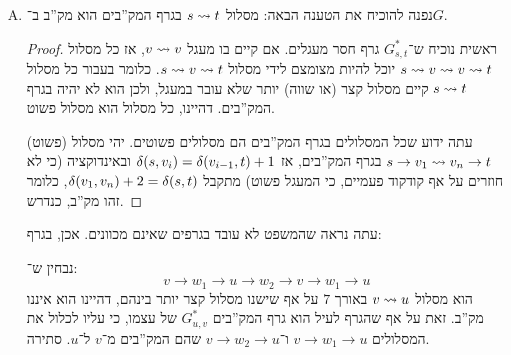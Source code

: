 \documentclass[]{../../../../tex/classes/homework}
\begin{document}
\begin{enumerate}[A.]
\begin{itemize}
			\item \textbf{סיבוכיות: }בבירור $\sof{E'} = 2 \sof E$. סיבוכיות האלגוריתם מהתרגול הייתה $\oc(\sof V + \sof {E'}) =\oc(\sof V + \sof E)$. המיפוי $(v, u) \to \{v, u\}$ לא תפגע בסיבוכיות כי עלותה $\oc(\sof E)$. 
			
			\item \textbf{נכונות: }למה: מסלול $v \to u$ הוא מק''ב בגרף המכוון אמ''מ הוא מק''ב בגרף שאיננו מכוון. ראשית נבחין שבשני הגרפים הוא מסלול כי בשני הכיוונים נוכל להתאים רצף של $w_1, w_2$ במסלול לקשת $(w_1, w_2) \mapsto \{w_1, w_2\}$. אם $v \squig u$ מק''ב בגרף המכוון, נניח בשלילה שיש מסלול קצר יותר בגרף שאיננו מכוון, ואז נוכל להשתמש בהתאמה לעיל כדי ליצור מסלול מכוון קצר יותר מ־$v \squig u$ שהתחלנו ממנו, וזו סתירה. הכיוון השני באופן דומה. 
			
			סה''כ, גרף המקב''ים שבנינו באמצעות האלגוריתם מההרצאה מהלמה לעיל מייצר את גרף המק''בים בפועל של הגרף הלא־מכוון (לאחר הכיוון שתואר בהליך האלגוריתם) כנדרש.
		\end{itemize}
		
		\item נפנה להוכיח את הטענה הבאה: מסלול $s \rightsquigarrow t$ בגרף המק''בים הוא מק''ב ב־$G$. \begin{proof}
			ראשית נוכיח ש־$G^*_{s, t}$ גרף חסר מעגלים. אם קיים בו מעגל $v \rightsquigarrow v$, אז כל מסלול $s \rightsquigarrow v \rightsquigarrow v \rightsquigarrow t$ יוכל להיות מצומצם לידי מסלול $s \rightsquigarrow v \rightsquigarrow t$. כלומר בעבור כל מסלול $s \rightsquigarrow t$ קיים מסלול קצר (או שווה) יותר שלא עובר במעגל, ולכן הוא לא יהיה בגרף המק''בים. דהיינו, כל מסלול הוא מסלול פשוט. 
			
			עתה ידוע שכל המסלולים בגרף המק''בים הם מסלולים פשוטים. יהי מסלול (פשוט) $s \to v_1 \rightsquigarrow v_n \to t$ בגרף המק''בים, אז $\delta(s, v_i) = \delta(v_{i - 1}, t) + 1$ ובאינדוקציה (כי לא חוזרים על אף קודקוד פעמיים, כי המעגל פשוט) מתקבל $\delta(v_1, v_n) + 2 = \delta(s, t)$, כלומר זהו מק''ב, כנדרש. 
		\end{proof}
		
		עתה נראה שהמשפט לא עובד בגרפים שאינם מכוונים. אכן, בגרף: 
		\begin{center}
			\sen {}
			\she
		\end{center}
		
		נבחין ש־: 
		\[ v \to w_1 \to u \to w_2 \to v \to w_1 \to u \]
		הוא מסלול $v \squig u$ באורך $7$ על אף שישנו מסלול קצר יותר בינהם, דהיינו הוא איננו מק''ב. זאת על אף שהגרף לעיל הוא גרף המק''בים $G^*_{u, v}$ של עצמו, כי עליו לכלול את המסלולים $v \to w_1 \to u$ ו־$v \to w_2 \to u$ שהם המק''בים מ־$v$ ל־$u$. סתירה. 
	\end{enumerate}
	
\end{document}
